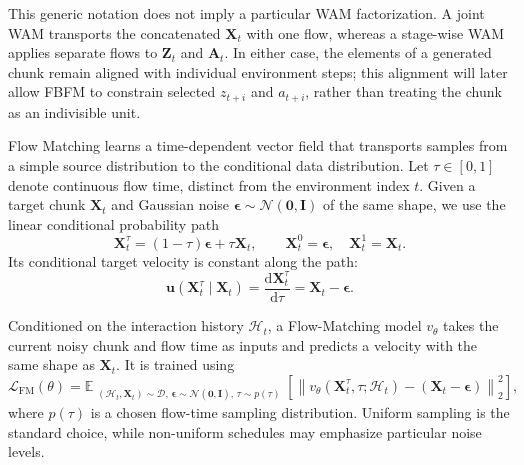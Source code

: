 This generic notation does not imply a particular WAM factorization. A joint WAM
transports the concatenated $\mathbf{X}_t$ with one flow, whereas a stage-wise WAM
applies separate flows to $\mathbf{Z}_t$ and $\mathbf{A}_t$. In either case, the
elements of a generated chunk remain aligned with individual environment steps; this
alignment will later allow FBFM to constrain selected $z_{t+i}$ and
$a_{t+i}$, rather than treating the chunk as an indivisible unit.

Flow Matching learns a time-dependent vector field that transports samples from a
simple source distribution to the conditional data distribution. Let
$\tau\in[0,1]$ denote continuous flow time, distinct from the environment index
$t$. Given a target chunk $\mathbf{X}_t$ and Gaussian noise
$\boldsymbol{\epsilon}\sim\mathcal{N}(\mathbf{0},\mathbf{I})$ of the same shape,
we use the linear conditional probability path
\begin{equation}
    \mathbf{X}_t^\tau
    = (1-\tau)\boldsymbol{\epsilon}+\tau\mathbf{X}_t,
    \qquad
    \mathbf{X}_t^0=\boldsymbol{\epsilon},
    \quad
    \mathbf{X}_t^1=\mathbf{X}_t.
    \label{eq:linear-flow-path}
\end{equation}
Its conditional target velocity is constant along the path:
\begin{equation}
    \mathbf{u}(\mathbf{X}_t^\tau\mid\mathbf{X}_t)
    = \frac{\mathrm{d}\mathbf{X}_t^\tau}{\mathrm{d}\tau}
    = \mathbf{X}_t-\boldsymbol{\epsilon}.
    \label{eq:conditional-flow-velocity}
\end{equation}

Conditioned on the interaction history $\mathcal{H}_t$, a Flow-Matching model
$v_\theta$ takes the current noisy chunk and flow time as inputs and predicts a
velocity with the same shape as $\mathbf{X}_t$. It is trained using
\begin{equation}
    \mathcal{L}_{\mathrm{FM}}(\theta)
    =
    \mathbb{E}_{\substack{
        (\mathcal{H}_t,\mathbf{X}_t)\sim\mathcal{D},\,
        \boldsymbol{\epsilon}\sim\mathcal{N}(\mathbf{0},\mathbf{I}),\,
        \tau\sim p(\tau)}}
    \left[
        \left\|
        v_\theta(\mathbf{X}_t^\tau,\tau;\mathcal{H}_t)
        -
        (\mathbf{X}_t-\boldsymbol{\epsilon})
        \right\|_2^2
    \right],
    \label{eq:flow-matching-objective}
\end{equation}
where $p(\tau)$ is a chosen flow-time sampling distribution. Uniform sampling is
the standard choice, while non-uniform schedules may emphasize particular noise
levels.

